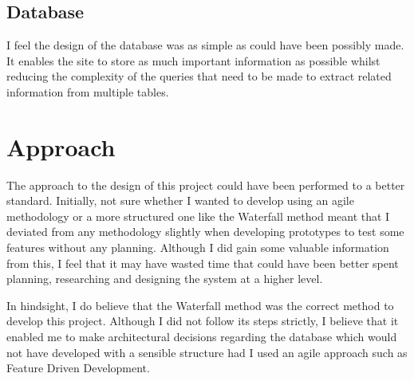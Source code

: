 \subsection{Database}
I feel the design of the database was as simple as could have been possibly made. It enables the site to store as much important information as possible whilst reducing the complexity of the queries that need to be made to extract related information from multiple tables. 

\section{Approach}
The approach to the design of this project could have been performed to a better standard. Initially, not sure whether I wanted to develop using an agile methodology or a more structured one like the Waterfall method meant that I deviated from any methodology slightly when developing prototypes to test some features without any planning. Although I did gain some valuable information from this, I feel that it may have wasted time that could have been better spent planning, researching and designing the system at a higher level.

In hindsight, I do believe that the Waterfall method was the correct method to develop this project. Although I did not follow its steps strictly, I believe that it enabled me to make architectural decisions regarding the database which would not have developed with a sensible structure had I used an agile approach such as Feature Driven Development. 
